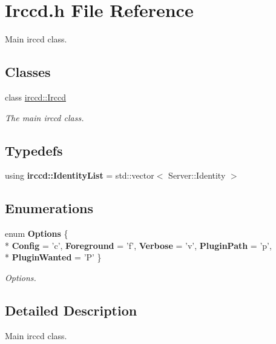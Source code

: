 \hypertarget{a00079}{\section{Irccd.\-h File Reference}
\label{a00079}
}


Main irccd class.  


\subsection*{Classes}
\begin{DoxyCompactItemize}
\item 
class \hyperlink{a00032}{irccd\-::\-Irccd}
\begin{DoxyCompactList}\small\item\em The main irccd class. \end{DoxyCompactList}\end{DoxyCompactItemize}
\subsection*{Typedefs}
\begin{DoxyCompactItemize}
\item 
using {\bfseries irccd\-::\-Identity\-List} = std\-::vector$<$ Server\-::\-Identity $>$
\end{DoxyCompactItemize}
\subsection*{Enumerations}
\begin{DoxyCompactItemize}
\item 
enum {\bfseries Options} \{ \\*
{\bfseries Config} = 'c', 
{\bfseries Foreground} = 'f', 
{\bfseries Verbose} = 'v', 
{\bfseries Plugin\-Path} = 'p', 
\\*
{\bfseries Plugin\-Wanted} = 'P'
 \}
\begin{DoxyCompactList}\small\item\em Options. \end{DoxyCompactList}\end{DoxyCompactItemize}


\subsection{Detailed Description}
Main irccd class. 